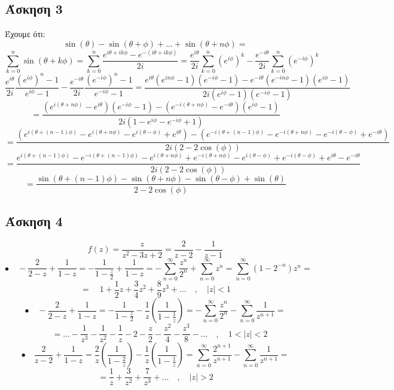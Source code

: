 \documentclass[12pt]{article}
\begin{document}
 \subsection{Άσκηση 3}
Έχουμε ότι:$$ {\sin(\theta)}-{\sin(\theta+\phi)}+...+{\sin(\theta+n\phi)}
=$$
$$
\sum_{k=0}^{n}{\sin(\theta+k\phi)}
=\sum_{k=0}^{n}{\frac{e^{i\theta+i k\phi}-e^{-(i\theta+i k\phi)}}{2i}}
=\frac{e^{i\theta}}{2i}\sum_{k=0}^{n}{(e^{ i \phi})}^k - \frac{e^{-i\theta}}{2i}\sum_{k=0}^{n}{(e^{- i \phi})}^k
$$
$$
\frac{e^{i\theta}}{2i} 
\frac{{(e^{ i \phi})}^n-1}{e^{i \phi}-1}
-\frac{e^{-i\theta}}{2i} 
\frac{{(e^{- i \phi})}^n-1}{e^{-i \phi}-1}=
\frac{e^{i\theta}(e^{i n\phi}-1)(e^{-i \phi}-1)-e^{-i \theta}(e^{-i n \phi}-1)(e^{i \phi}-1)}{2i(e^{i \phi}-1)(e^{-i \phi}-1)}$$
$$=\frac{(e^{i (\theta +n \phi)}-e^{i \theta})(e^{-i \phi}-1)-(e^{-i ( \theta + n\phi)}-e^{-i \theta})(e^{i \phi}-1)}{2i(1-e^{i \phi}-e^{-i \phi}+1)}
$$
$$=\frac{(e^{i (\theta + (n-1) \phi)}-e^{i (\theta +n \phi)}-e^{i (\theta - \phi)} + e^{i \theta})
-(e^{-i (\theta + (n-1) \phi)}-e^{-i (\theta +n \phi)}-e^{-i (\theta - \phi)} + e^{-i \theta})}
{2i(2-2\cos(\phi))}  $$
$$
=\frac{e^{i (\theta + (n-1) \phi)}-e^{-i (\theta + (n-1) \phi)}-e^{i (\theta +n \phi)}+e^{-i (\theta +n \phi)}-e^{i (\theta - \phi)}+e^{-i (\theta - \phi)} + e^{i \theta} - e^{-i \theta}}
{2i(2-2\cos(\phi))}
$$
$$=\frac{\sin(\theta + (n-1) \phi)-\sin(\theta + n \phi) -\sin(\theta - \phi)+\sin(\theta)}{2-2\cos(\phi)} $$


 \subsection{Άσκηση 4}

$$
f(z) = \frac{z}{z^2-3z+2}=
\frac{2}{z-2}-\frac{1}{z-1}
$$
$$
\bullet \quad
-\frac{2}{2-z}+\frac{1}{1-z}=
-\frac{1}{1-\frac{z}{2}}
+\frac{1}{1-z}
=-\sum_{n=0}^{\infty} \frac{z^n}{2^n}
+\sum_{n=0}^{\infty} z^n
=\sum_{n=0}^{\infty}(1-2^{-n})z^n=
$$ 
$$=\quad 1+\frac{1}{2}z+\frac{3}{4}z^2+\frac{8}{9}z^3+\ldots \quad,  \quad  |z|<1 $$
$$
\bullet \quad
-\frac{2}{2-z}+\frac{1}{1-z}=
-\frac{1}{1-\frac{z}{2}}
-\frac{1}{z}\left(\frac{1}{1-\frac{1}{z}} \right)
=-\sum_{n=0}^{\infty} \frac{z^n}{2^n}
-\sum_{n=0}^{\infty} \frac{1}{z^{n+1}}= 
$$
$$
\quad=\ldots -\frac{1}{z^3}-\frac{1}{z^2}-\frac{1}{z}-2-\frac{z}{2}-\frac{z^2}{4}-\frac{z^3}{8}-\ldots  \quad,  \quad  1<|z|<2
$$
$$
\bullet \quad
\frac{2}{z-2}+\frac{1}{1-z}=
\frac{2}{z}\left(\frac{1}{1-\frac{2}{z}}\right)
-\frac{1}{z}\left(\frac{1}{1-\frac{1}{z}}\right)
=\sum_{n=0}^{\infty} \frac{2^{n+1}}{z^{n+1}}
-\sum_{n=0}^{\infty} \frac{1}{z^{n+1}}=
$$
$$
=\frac{1}{z}+\frac{3}{z^2}+\frac{7}{z^3}+\ldots \quad,  \quad |z|>2
$$
\newpage
\end{document}
